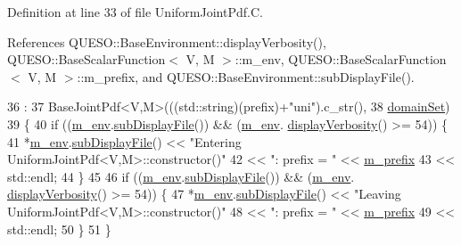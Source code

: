 Definition at line 33 of file Uniform\-Joint\-Pdf.\-C.



References Q\-U\-E\-S\-O\-::\-Base\-Environment\-::display\-Verbosity(), Q\-U\-E\-S\-O\-::\-Base\-Scalar\-Function$<$ V, M $>$\-::m\-\_\-env, Q\-U\-E\-S\-O\-::\-Base\-Scalar\-Function$<$ V, M $>$\-::m\-\_\-prefix, and Q\-U\-E\-S\-O\-::\-Base\-Environment\-::sub\-Display\-File().


\begin{DoxyCode}
36   :
37   BaseJointPdf<V,M>(((std::string)(prefix)+\textcolor{stringliteral}{"uni"}).c\_str(),
38                             \hyperlink{class_q_u_e_s_o_1_1_base_scalar_function_ad0937628825249dd36ded3ce0c7959ac}{domainSet})
39 \{
40   \textcolor{keywordflow}{if} ((\hyperlink{class_q_u_e_s_o_1_1_base_scalar_function_adf44141aeb765d97613286f88f235f04}{m\_env}.\hyperlink{class_q_u_e_s_o_1_1_base_environment_a8a0064746ae8dddfece4229b9ad374d6}{subDisplayFile}()) && (\hyperlink{class_q_u_e_s_o_1_1_base_scalar_function_adf44141aeb765d97613286f88f235f04}{m\_env}.
      \hyperlink{class_q_u_e_s_o_1_1_base_environment_a1fe5f244fc0316a0ab3e37463f108b96}{displayVerbosity}() >= 54)) \{
41     *\hyperlink{class_q_u_e_s_o_1_1_base_scalar_function_adf44141aeb765d97613286f88f235f04}{m\_env}.\hyperlink{class_q_u_e_s_o_1_1_base_environment_a8a0064746ae8dddfece4229b9ad374d6}{subDisplayFile}() << \textcolor{stringliteral}{"Entering UniformJointPdf<V,M>::constructor()"}
42                             << \textcolor{stringliteral}{": prefix = "} << \hyperlink{class_q_u_e_s_o_1_1_base_scalar_function_a6e81dc902aca6a546877da99b2f4a169}{m\_prefix}
43                             << std::endl;
44   \}
45 
46   \textcolor{keywordflow}{if} ((\hyperlink{class_q_u_e_s_o_1_1_base_scalar_function_adf44141aeb765d97613286f88f235f04}{m\_env}.\hyperlink{class_q_u_e_s_o_1_1_base_environment_a8a0064746ae8dddfece4229b9ad374d6}{subDisplayFile}()) && (\hyperlink{class_q_u_e_s_o_1_1_base_scalar_function_adf44141aeb765d97613286f88f235f04}{m\_env}.
      \hyperlink{class_q_u_e_s_o_1_1_base_environment_a1fe5f244fc0316a0ab3e37463f108b96}{displayVerbosity}() >= 54)) \{
47     *\hyperlink{class_q_u_e_s_o_1_1_base_scalar_function_adf44141aeb765d97613286f88f235f04}{m\_env}.\hyperlink{class_q_u_e_s_o_1_1_base_environment_a8a0064746ae8dddfece4229b9ad374d6}{subDisplayFile}() << \textcolor{stringliteral}{"Leaving UniformJointPdf<V,M>::constructor()"}
48                             << \textcolor{stringliteral}{": prefix = "} << \hyperlink{class_q_u_e_s_o_1_1_base_scalar_function_a6e81dc902aca6a546877da99b2f4a169}{m\_prefix}
49                             << std::endl;
50   \}
51 \}
\end{DoxyCode}
